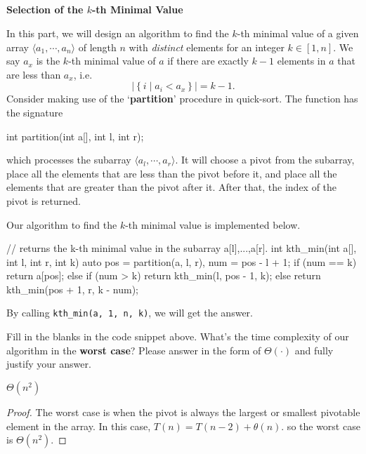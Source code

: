 
\begin{parts}
  \part{} \textbf{Selection of the \(k\)-th Minimal Value} \par
  In this part, we will design an algorithm to find the \(k\)-th minimal value of a given array \(\langle a_1,\cdots,a_n\rangle\) of length \(n\) with \emph{distinct} elements for an integer \(k\in[1,n]\). We say \(a_x\) is the \(k\)-th minimal value of \(a\) if there are exactly \(k-1\) elements in \(a\) that are less than \(a_x\), i.e.
  \[\left|\left\{i\mid a_i<a_x\right\}\right|=k-1.\]
  Consider making use of the `\textbf{partition}' procedure in quick-sort. The function has the signature
  \begin{cpp}
    int partition(int a[], int l, int r);
  \end{cpp}
  which processes the subarray \(\langle a_l,\cdots,a_r\rangle\). It will choose a pivot from the subarray, place all the elements that are less than the pivot before it, and place all the elements that are greater than the pivot after it. After that, the index of the pivot is returned.

  Our algorithm to find the \(k\)-th minimal value is implemented below.
  \begin{cpp}
    // returns the k-th minimal value in the subarray a[l],...,a[r].
    int kth_min(int a[], int l, int r, int k) {
        auto pos = partition(a, l, r), num = pos - l + 1;
        if (num == k)
        return a[pos];
        else if (num > k)
        return kth_min(l, pos - 1, k);
        else
        return kth_min(pos + 1, r, k - num);
      }
  \end{cpp}
  By calling \lstinline{kth_min(a, 1, n, k)}, we will get the answer.

  \begin{subparts}
    \subpart[2] Fill in the blanks in the code snippet above.
    \subpart[2] What's the time complexity of our algorithm in the \textbf{worst case}? Please answer in the form of \(\Theta(\cdot)\) and fully justify your answer.
    \begin{solution}
      $\Theta(n^2)$
      \begin{proof}
        The worst case is when the pivot is always the largest or smallest pivotable element in the array. In this case, $T(n) = T(n-2) + \theta(n)$.
        so the worst case is $\Theta(n^2)$.
      \end{proof}
    \end{solution}
  \end{subparts}


\end{parts}
